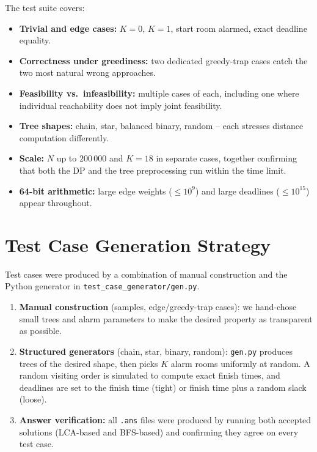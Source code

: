 \documentclass[11pt]{article}
\begin{document}
The test suite covers:
\begin{itemize}
  \item \textbf{Trivial and edge cases:} $K=0$, $K=1$, start room alarmed,
        exact deadline equality.
  \item \textbf{Correctness under greediness:} two dedicated greedy-trap
        cases catch the two most natural wrong approaches.
  \item \textbf{Feasibility vs.\ infeasibility:} multiple cases of each,
        including one where individual reachability does not imply joint
        feasibility.
  \item \textbf{Tree shapes:} chain, star, balanced binary, random -- each
        stresses distance computation differently.
  \item \textbf{Scale:} $N$ up to $200\,000$ and $K=18$ in separate cases,
        together confirming that both the DP and the tree preprocessing run
        within the time limit.
  \item \textbf{64-bit arithmetic:} large edge weights ($\le10^9$) and large
        deadlines ($\le10^{15}$) appear throughout.
\end{itemize}

\section*{Test Case Generation Strategy}

Test cases were produced by a combination of manual construction and the Python
generator in \texttt{test\_case\_generator/gen.py}.

\begin{enumerate}
  \item \textbf{Manual construction} (samples, edge/greedy-trap cases):
        we hand-chose small trees and alarm parameters to make the desired
        property as transparent as possible.

  \item \textbf{Structured generators} (chain, star, binary, random):
        \texttt{gen.py} produces trees of the desired shape, then picks $K$
        alarm rooms uniformly at random.  A random visiting order is simulated
        to compute exact finish times, and deadlines are set to the finish time
        (tight) or finish time plus a random slack (loose).

  \item \textbf{Answer verification:} all \texttt{.ans} files were produced
        by running both accepted solutions (LCA-based and BFS-based) and
        confirming they agree on every test case.
\end{enumerate}
\end{document}
